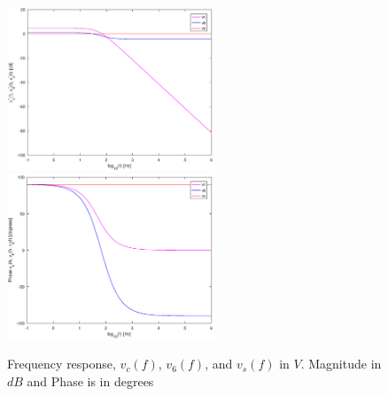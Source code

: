 \begin{figure}[!ht] 
\caption{Frequency response, $v_{c}(f)$, $v_6(f)$, and $v_s(f)$ in $V$. Magnitude in $dB$ and Phase is in degrees}
\includegraphics[width=0.55\textwidth]{theoretical_6_dB.eps}
\hfill\includegraphics[width=0.55\textwidth]{theoretical_6_phase.eps}
\label{fig:theoretical_6}
\end{figure}






